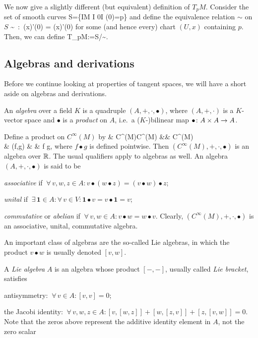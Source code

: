 \br
We now give a slightly different (but equivalent) definition of $T_pM$. Consider the set of smooth curves
\bse
S=\{\gamma\cl I\to M \mid {} I\se \R {} 0\in I  \gamma(0)=p\}
\ese
and define the equivalence relation $\sim$ on $S$
\bse
\gamma \sim \delta \ :\eqv \ (x\circ \gamma)'(0) = (x\circ \delta)'(0)  
\ese
for some (and hence every) chart $(U,x)$ containing $p$. Then, we can define
\bse
T_pM:=S/\!\sim.
\ese
\er

\subsection{Algebras and derivations}

Before we continue looking at properties of tangent spaces, we will have a short aside on algebras and derivations.

\bd
An \emph{algebra} over a field $K$ is a quadruple $(A,+,\cdot,\bullet)$, where $(A,+,\cdot)$ is a $K$-vector space and $\bullet$ is a \emph{product} on $A$, i.e.\ a ($K$-)bilinear map $\bullet \colon A\times A \to A$.
\ed

\be
Define a product on $C^\infty(M)$ by
\bullet \cl & C^\infty(M)\times C^\infty(M) &\to& C^\infty(M)\\
& (f,g) & \mapsto & f \bullet g,
\ei
where $f \bullet g$ is defined pointwise. Then $(C^\infty(M),+,\cdot,\bullet)$ is an algebra over $\mathbb{R}$.
\ee
The usual qualifiers apply to algebras as well.
\bd
An algebra $(A,+,\cdot,\bullet)$ is said to be
\ben[label=\roman*)]
\item \emph{associative} if $\ \forall \, v,w,z\in A :  v\bullet (w\bullet z) = (v\bullet w)\bullet z$;
\item \emph{unital} if $\ \exists \, \mathbf{1} \in A : \forall \, v \in V : \mathbf{1}\bullet v = v \bullet \mathbf{1} = v$;
\item \emph{commutative} or \emph{abelian} if $\ \forall \, v,w\in A :  v\bullet w = w\bullet v$.
\een
\ed
\be
Clearly, $(C^\infty(M),+,\cdot,\bullet)$ is an associative, unital, commutative algebra.
\ee

An important class of algebras are the so-called Lie algebras, in which the product $v\bullet w$ is usually denoted $[v,w]$.

\bd
A \emph{Lie algebra} $A$ is an algebra whose product $[-,-]$, usually called \emph{Lie bracket}, satisfies
\ben[label=\roman*)]
\item antisymmetry: $\ \forall\, v\in A : [v,v]=0$;
\item the Jacobi identity: $\ \forall\, v,w,z\in A : [v,[w,z]] + [w,[z,v]] + [z,[v,w]] = 0$.
\een
Note that the zeros above represent the additive identity element in $A$, not the zero scalar
\ed

